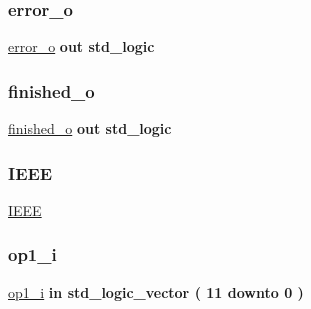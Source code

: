 \mbox{\label{classalu_a43d3fe459020288f9fd3fe64782b7402}} 
\subsubsection{\texorpdfstring{error\+\_\+o}{error\_o}}
{\footnotesize\ttfamily \hyperlink{classalu_a43d3fe459020288f9fd3fe64782b7402}{error\+\_\+o} {\bfseries \textcolor{keywordflow}{out}\textcolor{vhdlchar}{ }} {\bfseries \textcolor{comment}{std\+\_\+logic}\textcolor{vhdlchar}{ }} \hspace{0.3cm}{\ttfamily [Port]}}

\mbox{\label{classalu_a3e4609af33f8de496eb53352525eb9e7}} 
\subsubsection{\texorpdfstring{finished\+\_\+o}{finished\_o}}
{\footnotesize\ttfamily \hyperlink{classalu_a3e4609af33f8de496eb53352525eb9e7}{finished\+\_\+o} {\bfseries \textcolor{keywordflow}{out}\textcolor{vhdlchar}{ }} {\bfseries \textcolor{comment}{std\+\_\+logic}\textcolor{vhdlchar}{ }} \hspace{0.3cm}{\ttfamily [Port]}}

\mbox{\label{classalu_ae4f03c286607f3181e16b9aa12d0c6d4}} 
\subsubsection{\texorpdfstring{I\+E\+EE}{IEEE}}
{\footnotesize\ttfamily \hyperlink{classalu_ae4f03c286607f3181e16b9aa12d0c6d4}{I\+E\+EE}\hspace{0.3cm}{\ttfamily [Library]}}

\mbox{\label{classalu_a1127482098676cfc6ce7e98ba675ee27}} 
\subsubsection{\texorpdfstring{op1\+\_\+i}{op1\_i}}
{\footnotesize\ttfamily \hyperlink{classalu_a1127482098676cfc6ce7e98ba675ee27}{op1\+\_\+i} {\bfseries \textcolor{keywordflow}{in}\textcolor{vhdlchar}{ }} {\bfseries \textcolor{comment}{std\+\_\+logic\+\_\+vector}\textcolor{vhdlchar}{ }\textcolor{vhdlchar}{(}\textcolor{vhdlchar}{ }\textcolor{vhdlchar}{ } \textcolor{vhdldigit}{11} \textcolor{vhdlchar}{ }\textcolor{keywordflow}{downto}\textcolor{vhdlchar}{ }\textcolor{vhdlchar}{ } \textcolor{vhdldigit}{0} \textcolor{vhdlchar}{ }\textcolor{vhdlchar}{)}\textcolor{vhdlchar}{ }} \hspace{0.3cm}{\ttfamily [Port]}}


